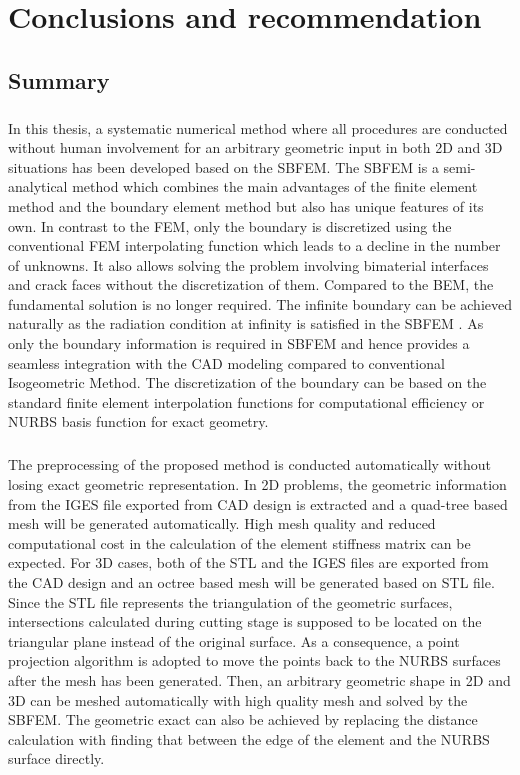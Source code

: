 
\chapter{Conclusions and recommendation}
\section{Summary}
\paragraph{}
In this thesis, a systematic numerical method where all procedures are conducted without human involvement for an arbitrary geometric input in both 2D and 3D situations has been developed based on the SBFEM.
The SBFEM is a semi-analytical method which combines the main advantages of the finite element method and the boundary element method but also has unique features of its own.
In contrast to the FEM, only the boundary is discretized using the conventional FEM interpolating function which leads to a decline in the number of unknowns.
It also allows solving the problem involving bimaterial interfaces and crack faces without the discretization of them.
Compared to the BEM, the fundamental solution is no longer required.
The infinite boundary can be achieved naturally as the radiation condition at infinity is satisfied in the SBFEM .
As only the boundary information is required in SBFEM and hence provides a seamless integration with the CAD modeling compared to conventional Isogeometric Method.
The discretization of the boundary can be based on the standard finite element interpolation functions for computational efficiency or NURBS basis function for exact geometry.

\paragraph{}
The preprocessing of the proposed method is conducted automatically without losing exact geometric representation.
In 2D problems, the geometric information from the IGES file exported from CAD design is extracted and a quad-tree based mesh will be generated automatically.
High mesh quality and reduced computational cost in the calculation of the element stiffness matrix can be expected. 
For 3D cases, both of the STL and the IGES files are exported from the CAD design and an octree based mesh will be generated based on STL file.
Since the STL file represents the triangulation of the geometric surfaces, intersections calculated during cutting stage is supposed to be located on the triangular plane instead of the original surface.
As a consequence, a point projection algorithm is adopted to move the points back to the NURBS surfaces after the mesh has been generated.
Then, an arbitrary geometric shape in 2D and 3D can be meshed automatically with high quality mesh and solved by the SBFEM.
The geometric exact can also be achieved by replacing the distance calculation with finding that between the edge of the element and the NURBS surface directly. 

